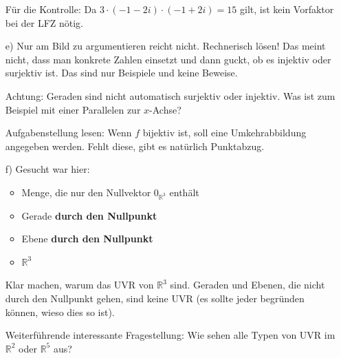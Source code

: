 \documentclass[11pt, a4paper]{article}
\newcommand{\R}{\mathbb{R}}
\begin{document}
\begin{itemize}
Für die Kontrolle: Da $3\cdot(-1-2i)\cdot(-1+2i) = 15$ gilt, ist kein  Vorfaktor bei der LFZ nötig.

\item[e)] Nur am Bild zu argumentieren reicht nicht. Rechnerisch lösen! Das meint nicht, dass man konkrete Zahlen einsetzt und dann guckt, ob es injektiv oder surjektiv ist. Das sind nur Beispiele und keine Beweise.

Achtung: Geraden sind nicht automatisch surjektiv oder injektiv. Was ist zum Beispiel mit einer Parallelen zur $x$-Achse?

Aufgabenstellung lesen: Wenn $f$ bijektiv ist, soll eine Umkehrabbildung angegeben werden. Fehlt diese, gibt es natürlich Punktabzug.

\item[f)] Gesucht war hier:
\begin{itemize}
\item Menge, die nur den Nullvektor $0_{\R^3}$ enthält
\item Gerade \textbf{durch den Nullpunkt}
\item Ebene \textbf{durch den Nullpunkt}
\item $\R^3$
\end{itemize}

Klar machen, warum das UVR von $\R^3$ sind. Geraden und Ebenen, die nicht durch den Nullpunkt gehen, sind keine UVR (es sollte jeder begründen können, wieso dies so ist).

Weiterführende interessante Fragestellung: Wie sehen alle Typen von UVR im $\R^2$ oder $\R^5$ aus?
\end{itemize}







\newpage
\end{document}
